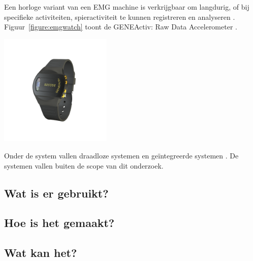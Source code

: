 Een horloge variant van een EMG machine is verkrijgbaar om langdurig, of bij specifieke activiteiten, 
spieractiviteit te kunnen registreren en analyseren \cite{sips2024,activinsights2022}. 
Figuur~\ref{figure:emgwatch} toont de GENEActiv: Raw Data Accelerometer \cite{activinsights2022}.

\begin{center}
    \includegraphics[width=0.4\textwidth]{./graphics/img-emgwatch.png}
    \label{figure:emgwatch}
\end{center}

Onder de system vallen draadloze systemen en geïntegreerde systemen \cite{gohel2020}.
De systemen vallen buiten de scope van dit onderzoek.

\subsection{Wat is er gebruikt?}

\subsection{Hoe is het gemaakt?}

\subsection{Wat kan het?}
